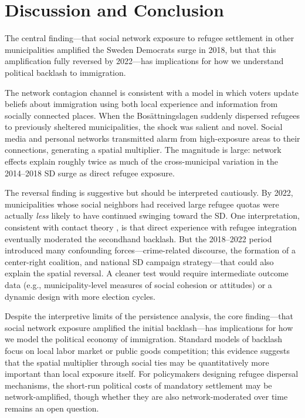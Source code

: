 \documentclass[12pt]{article}
\begin{document}



\section{Discussion and Conclusion}

The central finding---that social network exposure to refugee settlement in other municipalities amplified the Sweden Democrats surge in 2018, but that this amplification fully reversed by 2022---has implications for how we understand political backlash to immigration.

The network contagion channel is consistent with a model in which voters update beliefs about immigration using both local experience and information from socially connected places. When the Bos\"{a}ttningslagen suddenly dispersed refugees to previously sheltered municipalities, the shock was salient and novel. Social media and personal networks transmitted alarm from high-exposure areas to their connections, generating a spatial multiplier. The magnitude is large: network effects explain roughly twice as much of the cross-municipal variation in the 2014--2018 SD surge as direct refugee exposure.

The reversal finding is suggestive but should be interpreted cautiously. By 2022, municipalities whose social neighbors had received large refugee quotas were actually \emph{less} likely to have continued swinging toward the SD. One interpretation, consistent with contact theory \citep{allport1954nature}, is that direct experience with refugee integration eventually moderated the secondhand backlash. But the 2018--2022 period introduced many confounding forces---crime-related discourse, the formation of a center-right coalition, and national SD campaign strategy---that could also explain the spatial reversal. A cleaner test would require intermediate outcome data (e.g., municipality-level measures of social cohesion or attitudes) or a dynamic design with more election cycles.

Despite the interpretive limits of the persistence analysis, the core finding---that social network exposure amplified the initial backlash---has implications for how we model the political economy of immigration. Standard models of backlash focus on local labor market or public goods competition; this evidence suggests that the spatial multiplier through social ties may be quantitatively more important than local exposure itself. For policymakers designing refugee dispersal mechanisms, the short-run political costs of mandatory settlement may be network-amplified, though whether they are also network-moderated over time remains an open question.
\end{document}
